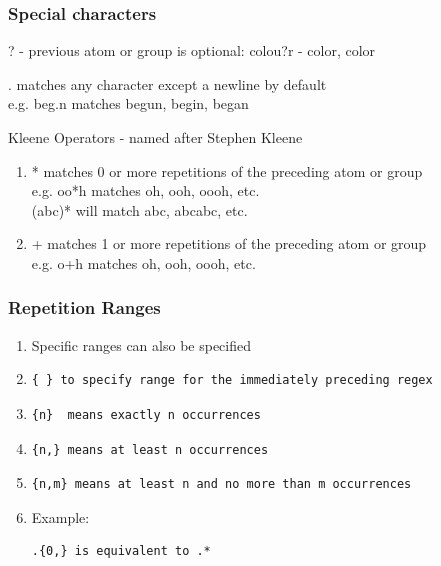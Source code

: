 \documentclass[compress, black]{beamer}
\begin{document}
\begin{frame}[fragile]
  \frametitle{Special characters}
  \begin{large_enum}
  \item[-]<1->? - previous atom or group is optional: colou?r - color, color
  \item[-]<2-> . matches any character except a newline by default\\
          e.g. beg.n matches begun, begin, began
  \item[-]<3->Kleene Operators - named after Stephen Kleene
      \begin{enumerate}
      \item[-]<4->*  matches 0 or more repetitions of the preceding atom or group\\
            e.g. oo*h matches oh, ooh, oooh, etc.\\
            (abc)* will match abc, abcabc, etc.
      \item[-]<5->+  matches 1 or more repetitions of the preceding atom or group\\
            e.g. o+h matches oh, ooh, oooh, etc.
      \end{enumerate}
  \end{large_enum}
\end{frame}

\begin{frame}[fragile]
  \frametitle{Repetition Ranges}
  \begin{enumerate}
  \item[-]<1-> Specific ranges can also be specified
  \item[-]<2-> \small \begin{verbatim}
{ } to specify range for the immediately preceding regex
\end{verbatim}
  \item[-]<3-> \begin{verbatim}
{n}  means exactly n occurrences
\end{verbatim}
  \item[-]<4-> \begin{verbatim}
{n,} means at least n occurrences
\end{verbatim}
  \item[-]<5-> \begin{verbatim}
{n,m} means at least n and no more than m occurrences
\end{verbatim}
  \item[-]<6-> Example: \begin{verbatim}
.{0,} is equivalent to .*
\end{verbatim}
  \end{enumerate}
\end{frame}
\end{document}

